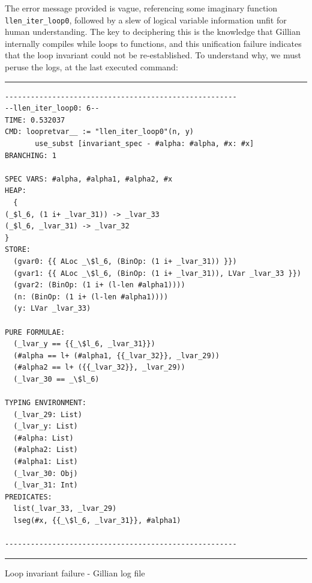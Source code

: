 The error message provided is vague, referencing some imaginary function
\texttt{llen\_iter\_loop0}, followed by a slew of logical variable information
unfit for human understanding. The key to deciphering this is the knowledge that
Gillian internally compiles while loops to functions, and this unification
failure indicates that the loop invariant could not be re-established. To
understand why, we must peruse the logs, at the last executed command:
\begin{listing}[!ht]
\noindent\rule{\textwidth}{0.5pt}
\vspace{-0.6cm}
\begin{verbatim}
------------------------------------------------------
--llen_iter_loop0: 6--
TIME: 0.532037
CMD: loopretvar__ := "llen_iter_loop0"(n, y) 
       use_subst [invariant_spec - #alpha: #alpha, #x: #x]
BRANCHING: 1

SPEC VARS: #alpha, #alpha1, #alpha2, #x
HEAP:
  {
(_$l_6, (1 i+ _lvar_31)) -> _lvar_33
(_$l_6, _lvar_31) -> _lvar_32
}
STORE:
  (gvar0: {{ ALoc _\$l_6, (BinOp: (1 i+ _lvar_31)) }})
  (gvar1: {{ ALoc _\$l_6, (BinOp: (1 i+ _lvar_31)), LVar _lvar_33 }})
  (gvar2: (BinOp: (1 i+ (l-len #alpha1))))
  (n: (BinOp: (1 i+ (l-len #alpha1))))
  (y: LVar _lvar_33)

PURE FORMULAE:
  (_lvar_y == {{_\$l_6, _lvar_31}})
  (#alpha == l+ (#alpha1, {{_lvar_32}}, _lvar_29))
  (#alpha2 == l+ ({{_lvar_32}}, _lvar_29))
  (_lvar_30 == _\$l_6)

TYPING ENVIRONMENT:
  (_lvar_29: List)
  (_lvar_y: List)
  (#alpha: List)
  (#alpha2: List)
  (#alpha1: List)
  (_lvar_30: Obj)
  (_lvar_31: Int)
PREDICATES:
  list(_lvar_33, _lvar_29)
  lseg(#x, {{_\$l_6, _lvar_31}}, #alpha1)

------------------------------------------------------
\end{verbatim}
\vspace{-0.4cm}
\noindent\rule{\textwidth}{0.5pt}
\vspace{-0.6cm}
\caption{Loop invariant failure - Gillian log file}
\end{listing}


